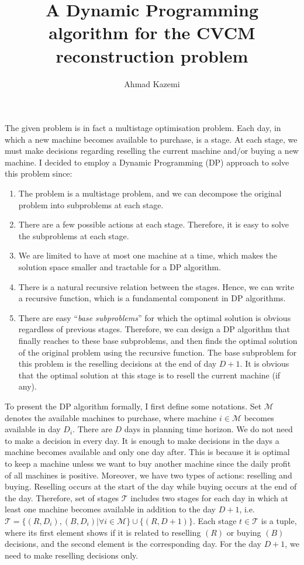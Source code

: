 \documentclass{article}
\title{A Dynamic Programming algorithm for the CVCM reconstruction problem}
\author{Ahmad Kazemi}
\date{ }
\begin{document}
\maketitle

The given problem is in fact a multistage optimisation problem. 
Each day, in which a new machine becomes available to purchase, is a stage.
At each stage, we must make decisions regarding reselling the current machine and/or buying a new machine.
I decided to employ a Dynamic Programming (DP) approach to solve this problem since:
\begin{enumerate}
    \item The problem is a multistage problem, and we can decompose the original problem into subproblems at each stage. 
    \item There are a few possible actions at each stage. Therefore, it is easy to solve the subproblems at each stage.
    \item We are limited to have at most one machine at a time, which makes the solution space smaller and tractable for a DP algorithm.
    \item There is a natural recursive relation between the stages. Hence, we can write a recursive function, which is a fundamental component in DP algorithms.
    \item There are easy ``\emph{base subproblems}'' for which the optimal solution is obvious regardless of previous stages. Therefore, we can design a DP algorithm that finally reaches to these base subproblems, and then finds the optimal solution of the original problem using the recursive function. The base subproblem for this problem is the reselling decisions at the end of day $D+1$. It is obvious that the optimal solution at this stage is to resell the current machine (if any).
\end{enumerate}

To present the DP algorithm formally, I first define some notations. 
Set $\mathcal{M}$ denotes the available machines to purchase, where machine $i \in \mathcal{M}$ becomes available in day $D_i$.
There are $D$ days in planning time horizon. 
We do not need to make a decision in every day.
It is enough to make decisions in the days a machine becomes available and only one day after. 
This is because it is optimal to keep a machine unless we want to buy another machine since the daily profit of all machines is positive.
Moreover, we have two types of actions: reselling and buying. 
Reselling occurs at the start of the day while buying occurs at the end of the day.
Therefore, set of stages $\mathcal{T}$ includes two stages for each day in which at least one machine becomes available in addition to the day $D+1$, i.e. $\mathcal{T} = \{ (R, D_i), (B, D_i) | \forall i \in \mathcal{M} \} \cup \{(R,D+1)\}$. 
Each stage $t\in \mathcal{T}$ is a tuple, where its first element shows if it is related to reselling $(R)$ or buying $(B)$ decisions, and the second element is the corresponding day. 
For the day $D+1$, we need to make reselling decisions only.
\end{document}
